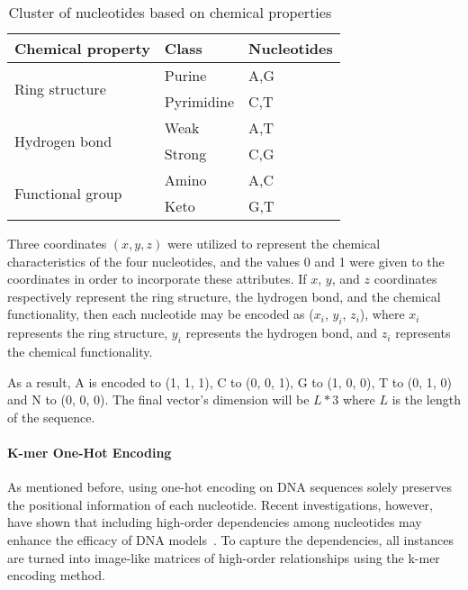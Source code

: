 \begin{table}[ht]
	\caption{Cluster of nucleotides based on chemical properties~\cite{GolamBari2013DNASequence}}
	\label{tab:chemical_encoding}
    \centering
    \begin{tabular}{lll}
    	\toprule
    	\textbf{Chemical property} & \textbf{Class} & \textbf{Nucleotides} \\\midrule
    	
    	\multirow{2}{*}{Ring structure} & Purine & A,G \\
    	& Pyrimidine & C,T\\\midrule
    	
    	\multirow{2}{*}{Hydrogen bond} & Weak & A,T\\
    	& Strong & C,G\\\midrule
    	
    	\multirow{2}{*}{Functional group} & Amino & A,C\\
    	& Keto & G,T\\
        
    	\bottomrule
    \end{tabular}
\end{table}

Three coordinates $(x, y, z)$ were utilized to represent the chemical characteristics of the four nucleotides, and the values 0 and 1 were given to the coordinates in order to incorporate these attributes. If $x$, $y$, and $z$ coordinates respectively represent the ring structure, the hydrogen bond, and the chemical functionality, then each nucleotide may be encoded as ($x_{i}$, $y_{i}$, $z_{i}$), where $x_{i}$ represents the ring structure, $y_{i}$ represents the hydrogen bond, and $z_{i}$ represents the chemical functionality.

As a result, \gls{A} is encoded to (1, 1, 1), \gls{C} to (0, 0, 1), \gls{G} to (1, 0, 0), \gls{T} to (0, 1, 0) and N to (0, 0, 0). The final vector's dimension will be $L * 3$ where $L$ is the length of the sequence.


\paragraph{K-mer One-Hot Encoding}

As mentioned before, using one-hot encoding on \gls{DNA} sequences solely preserves the positional information of each nucleotide. Recent investigations, however, have shown that including high-order dependencies among nucleotides may enhance the efficacy of \gls{DNA} models~\cite{Zhang2019ModelingNetwork}. To capture the dependencies, all instances are turned into image-like matrices of high-order relationships using the k-mer encoding method.

